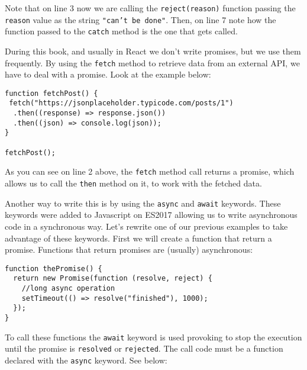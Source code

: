 \documentclass[a4paper, oneside, titlepage, 12pt]{book}
\begin{document}
Note that on line 3 now we are calling the \texttt{reject(reason)} function passing the \texttt{reason} value as the string \texttt{"can't be done"}. Then, on line 7 note how the function passed to the \texttt{catch} method is the one that gets called.  
\newline

During this book, and usually in React we don't write promises, but we use them frequently. By using the \texttt{fetch} method to retrieve data from an external API, we have to deal with a promise. Look at the example below:

\begin{verbatim}
function fetchPost() {
 fetch("https://jsonplaceholder.typicode.com/posts/1")
  .then((response) => response.json())
  .then((json) => console.log(json));
}

fetchPost();
\end{verbatim}

As you can see on line 2 above, the \texttt{fetch} method call returns a promise, which allows us to call the \texttt{then} method on it, to work with the fetched data.
\newline

Another way to write this is by using the \texttt{async} and \texttt{await} keywords. These keywords were added to Javascript on ES2017 allowing us to write asynchronous code in a synchronous way. Let's rewrite one of our previous examples to take advantage of these keywords. First we will create a function that return a promise. Functions that return promises are (usually) asynchronous:  

\begin{verbatim}
function thePromise() {
  return new Promise(function (resolve, reject) {
    //long async operation
    setTimeout(() => resolve("finished"), 1000);
  });
}
\end{verbatim}

To call these functions the \texttt{await} keyword is used provoking to stop the execution until the promise is \texttt{resolved} or \texttt{rejected}. The call code must be a function declared with the \texttt{async} keyword. See below: 
\end{document}
